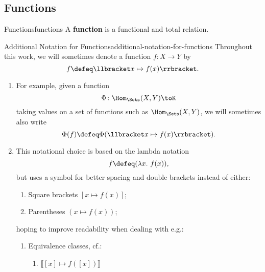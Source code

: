 \subsection{Functions}\label{subsection-sets-and-functions-functions}
\begin{definition}{Functions}{functions}%
    A \textbf{function} is a functional and total relation.
\end{definition}
\begin{notation}{Additional Notation for Functions}{additional-notation-for-functions}%
    Throughout this work, we will sometimes denote a function $f\colon X\to Y$ by
    \[
        f%
        \defeq%
        \llbracket x\mapsto f(x)\rrbracket.%
    \]%
    \begin{enumerate}
        \item\label{additional-notation-for-functions-1}For example, given a function%
            \[
                \Phi%
                \colon%
                \Hom_{\Sets}(X,Y)%
                \to%
                K%
            \]%
            taking values on a set of functions such as $\Hom_{\Sets}(X,Y)$, we will sometimes also write
            \[
                \Phi(f)%
                \defeq%
                \Phi(\llbracket x\mapsto f(x)\rrbracket).%
            \]%
        \item\label{additional-notation-for-functions-2}This notational choice is based on the lambda notation
            \[
                f%
                \defeq%
                (\lambda x.\ f(x)),%
            \]%
            but uses a \say{$\mathord{\mapsto}$} symbol for better spacing and double brackets instead of either:
            \begin{enumerate}
                \item\label{additional-notation-for-functions-2-a}Square brackets $[x\mapsto f(x)]$;
                \item\label{additional-notation-for-functions-2-b}Parentheses $(x\mapsto f(x))$;
            \end{enumerate}
            hoping to improve readability when dealing with e.g.:
            \begin{enumerate}
                \item\label{additional-notation-for-functions-2-c}Equivalence classes, cf.:
                    \begin{enumerate}
                        \item\label{additional-notation-for-functions-2-c-i}$\llbracket[x]\mapsto f([x])\rrbracket$%

\end{enumerate}
\end{enumerate}
\end{enumerate}
\end{notation}
